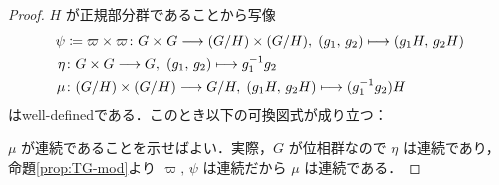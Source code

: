\documentclass[algtopo_main]{subfiles}
\begin{document}
\begin{proof}
    $H$ が正規部分群であることから写像
    \begin{align}
        \psi &\coloneqq \varpi \times \varpi \colon G \times G \longrightarrow (G/H) \times (G/H),\; (g_1,\, g_2) \longmapsto (g_1 H,\, g_2 H) \\
        \eta  &\colon G \times G \longrightarrow G,\; (g_1,\, g_2) \longmapsto g_1^{-1} g_2 \\
        \mu &\colon (G/H) \times (G/H) \longrightarrow G/H,\; (g_1 H,\, g_2 H) \longmapsto (g_1^{-1} g_2) H
    \end{align}
    はwell-definedである．このとき以下の可換図式が成り立つ：
    \begin{center}
    \end{center}
    $\mu$ が連続であることを示せばよい．実際，$G$ が位相群なので $\eta$ は連続であり，命題\ref{prop:TG-mod}より $\varpi,\, \psi$ は連続だから $\mu$ は連続である．
\end{proof}
\end{document}
